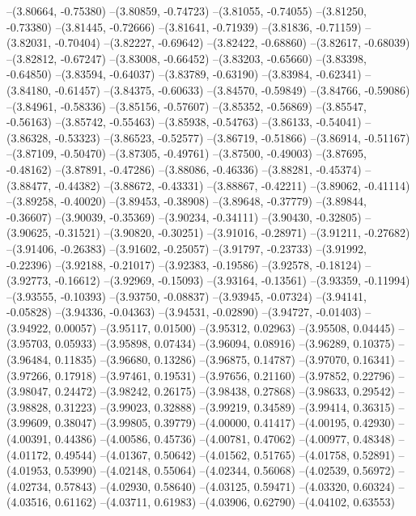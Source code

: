 --(3.80664, -0.75380)
--(3.80859, -0.74723)
--(3.81055, -0.74055)
--(3.81250, -0.73380)
--(3.81445, -0.72666)
--(3.81641, -0.71939)
--(3.81836, -0.71159)
--(3.82031, -0.70404)
--(3.82227, -0.69642)
--(3.82422, -0.68860)
--(3.82617, -0.68039)
--(3.82812, -0.67247)
--(3.83008, -0.66452)
--(3.83203, -0.65660)
--(3.83398, -0.64850)
--(3.83594, -0.64037)
--(3.83789, -0.63190)
--(3.83984, -0.62341)
--(3.84180, -0.61457)
--(3.84375, -0.60633)
--(3.84570, -0.59849)
--(3.84766, -0.59086)
--(3.84961, -0.58336)
--(3.85156, -0.57607)
--(3.85352, -0.56869)
--(3.85547, -0.56163)
--(3.85742, -0.55463)
--(3.85938, -0.54763)
--(3.86133, -0.54041)
--(3.86328, -0.53323)
--(3.86523, -0.52577)
--(3.86719, -0.51866)
--(3.86914, -0.51167)
--(3.87109, -0.50470)
--(3.87305, -0.49761)
--(3.87500, -0.49003)
--(3.87695, -0.48162)
--(3.87891, -0.47286)
--(3.88086, -0.46336)
--(3.88281, -0.45374)
--(3.88477, -0.44382)
--(3.88672, -0.43331)
--(3.88867, -0.42211)
--(3.89062, -0.41114)
--(3.89258, -0.40020)
--(3.89453, -0.38908)
--(3.89648, -0.37779)
--(3.89844, -0.36607)
--(3.90039, -0.35369)
--(3.90234, -0.34111)
--(3.90430, -0.32805)
--(3.90625, -0.31521)
--(3.90820, -0.30251)
--(3.91016, -0.28971)
--(3.91211, -0.27682)
--(3.91406, -0.26383)
--(3.91602, -0.25057)
--(3.91797, -0.23733)
--(3.91992, -0.22396)
--(3.92188, -0.21017)
--(3.92383, -0.19586)
--(3.92578, -0.18124)
--(3.92773, -0.16612)
--(3.92969, -0.15093)
--(3.93164, -0.13561)
--(3.93359, -0.11994)
--(3.93555, -0.10393)
--(3.93750, -0.08837)
--(3.93945, -0.07324)
--(3.94141, -0.05828)
--(3.94336, -0.04363)
--(3.94531, -0.02890)
--(3.94727, -0.01403)
--(3.94922, 0.00057)
--(3.95117, 0.01500)
--(3.95312, 0.02963)
--(3.95508, 0.04445)
--(3.95703, 0.05933)
--(3.95898, 0.07434)
--(3.96094, 0.08916)
--(3.96289, 0.10375)
--(3.96484, 0.11835)
--(3.96680, 0.13286)
--(3.96875, 0.14787)
--(3.97070, 0.16341)
--(3.97266, 0.17918)
--(3.97461, 0.19531)
--(3.97656, 0.21160)
--(3.97852, 0.22796)
--(3.98047, 0.24472)
--(3.98242, 0.26175)
--(3.98438, 0.27868)
--(3.98633, 0.29542)
--(3.98828, 0.31223)
--(3.99023, 0.32888)
--(3.99219, 0.34589)
--(3.99414, 0.36315)
--(3.99609, 0.38047)
--(3.99805, 0.39779)
--(4.00000, 0.41417)
--(4.00195, 0.42930)
--(4.00391, 0.44386)
--(4.00586, 0.45736)
--(4.00781, 0.47062)
--(4.00977, 0.48348)
--(4.01172, 0.49544)
--(4.01367, 0.50642)
--(4.01562, 0.51765)
--(4.01758, 0.52891)
--(4.01953, 0.53990)
--(4.02148, 0.55064)
--(4.02344, 0.56068)
--(4.02539, 0.56972)
--(4.02734, 0.57843)
--(4.02930, 0.58640)
--(4.03125, 0.59471)
--(4.03320, 0.60324)
--(4.03516, 0.61162)
--(4.03711, 0.61983)
--(4.03906, 0.62790)
--(4.04102, 0.63553)
